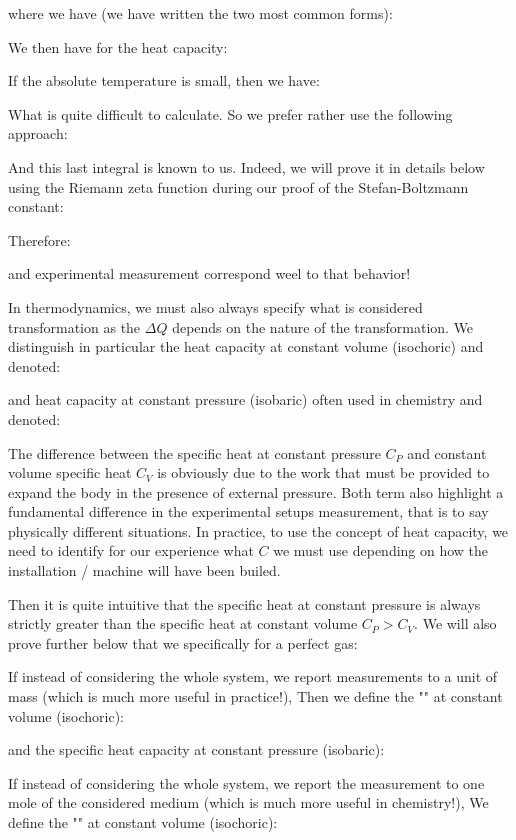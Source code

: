 	where we have (we have written the two most common forms):
	
	We then have for the heat capacity:
	
	If the absolute temperature is small, then we have:
	
	What is quite difficult to calculate. So we prefer rather use the following approach:
	
	And this last integral is known to us. Indeed, we will prove it in details below using the Riemann zeta function during our proof of the Stefan-Boltzmann constant:
	
	Therefore:
	
	and experimental measurement correspond weel to that behavior!
	
	In thermodynamics, we must also always specify what is considered transformation as the $\Delta Q$ depends on the nature of the transformation. We distinguish in particular the heat capacity at constant volume (isochoric) and denoted:
	
	and heat capacity at constant pressure (isobaric) often used in chemistry and denoted:
	
	The difference between the specific heat at constant pressure $C_P$ and constant volume specific heat $C_V$ is obviously due to the work that must be provided to expand the body in the presence of external pressure. Both term also highlight a fundamental difference in the experimental setups measurement, that is to say physically different situations. In practice, to use the concept of heat capacity, we need to identify for our experience what $C$ we must use depending on how the installation / machine will have been builed.

	Then it is quite intuitive that the specific heat at constant pressure is always strictly greater than the specific heat at constant volume $C_P> C_V$. We will also prove further below that we specifically for a perfect gas:
	
	If instead of considering the whole system, we report measurements to a unit of mass (which is much more useful in practice!), Then we define the "" at constant volume (isochoric):
	
	and the specific heat capacity at constant pressure (isobaric):
	
	If instead of considering the whole system, we report the measurement to one mole of the considered medium (which is much more useful in chemistry!), We define the "" at constant volume (isochoric):
	
